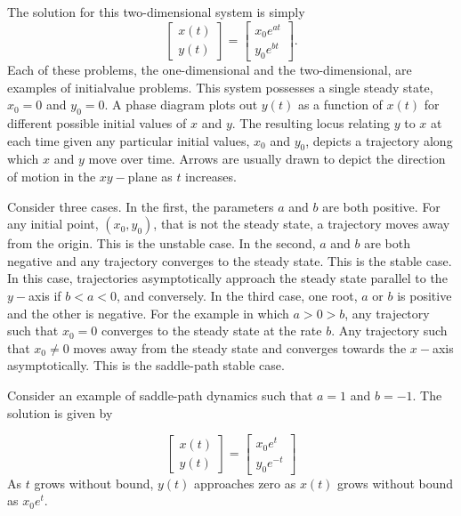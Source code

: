 The solution for this two-dimensional system is simply
\begin{equation*}
\begin{bmatrix}
x(t)\\y(t)
\end{bmatrix}
=\begin{bmatrix}
x_{0}e^{at}\\y_{0}e^{bt}
\end{bmatrix}.
\end{equation*}
Each of these problems, the one-dimensional and the two-dimensional, are examples of initialvalue problems. This system possesses a single steady state, $x_{0}=0$ and $y_{0}=0$. A phase diagram plots out $y(t)$ as a function of $x(t)$ for different possible initial values of $x$ and $y$. The resulting locus relating $y$ to $x$ at each time given any particular initial values, $x_{0}$ and $y_{0}$, depicts a trajectory along which $x$ and $y$ move over time. Arrows are usually drawn to depict the direction of motion in the $xy-$plane as $t$ increases.

Consider three cases. In the first, the parameters $a$ and $b$ are both positive. For any initial point, $(x_{0},y_{0})$,  that is not the steady state, a trajectory moves away from the origin. This is the unstable case. In the second, $a$ and $b$ are both negative and any trajectory converges to the steady state. This is the stable case. In this case, trajectories asymptotically approach the steady state parallel to the $y-$axis if $b<a<0$, and conversely. In the third case, one root, $a$ or $b$ is positive and the other is negative. For the example in which $a>0>b$, any trajectory such that $x_{0}=0$ converges to the steady state at the rate $b$. Any trajectory such that $x_{0}\not =0$ moves away from the steady state and converges towards the $x-$axis asymptotically. This is the saddle-path stable case.

Consider an example of saddle-path dynamics such that $a=1$ and $b=−1$. The solution is given by

\begin{equation*}
\begin{bmatrix}
x(t)\\
y(t)
\end{bmatrix}
= \begin{bmatrix}
x_{0}e^{t}\\
y_{0}e^{-t}
\end{bmatrix}
\end{equation*}
As $t$ grows without bound, $y(t)$ approaches zero as $x(t)$ grows without bound as $x_{0}e^{t}$.

